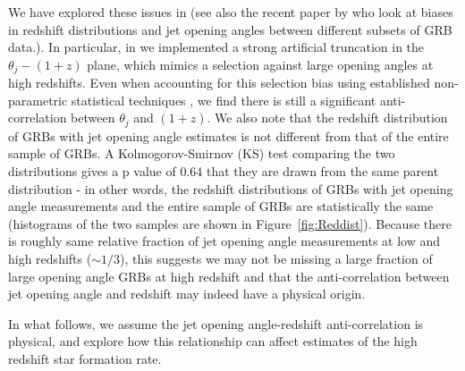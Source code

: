 \documentclass[fleqn,usenatbib,useAMS]{mnras}
\begin{document}
   We have explored these issues in \cite{LR19,LR20}  (see also the recent paper by \cite{Le20} who look at biases in redshift distributions and jet opening angles between different subsets of GRB data.).  In particular, in \cite{LR20} we implemented a strong artificial truncation in the $\theta_{j}-(1+z)$ plane, which mimics a selection against large opening angles at high redshifts.  Even when accounting for this selection bias using established non-parametric statistical techniques \citep{EP92,ep98}, we find there is still a significant anti-correlation between $\theta_{j}$ and $(1+z)$.  We also note that the redshift distribution of GRBs with jet opening angle estimates is not different from that of the entire sample of GRBs. A Kolmogorov-Smirnov (KS) test comparing the two distributions gives a p value of 0.64 that they are drawn from the same parent distribution - in other words, the redshift distributions of GRBs with jet opening angle measurements and the entire sample of GRBs are statistically the same (histograms of the two samples are shown in Figure~\ref{fig:Reddist}). Because there is roughly same relative fraction of jet opening angle measurements at low and high redshifts ($\sim 1/3$), this suggests we may not be missing a large fraction of large opening angle GRBs at high redshift and that the anti-correlation between jet opening angle and redshift may indeed have a physical origin.  
   
   
 
   In what follows, we assume the jet opening angle-redshift anti-correlation is physical, and explore how this relationship can affect estimates of the high redshift star formation rate.
   
\end{document}

